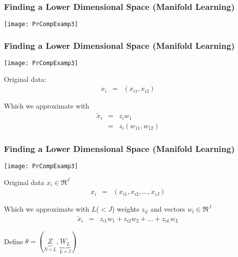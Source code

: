 \begin{frame}[fragile]
\frametitle{Finding a Lower Dimensional Space (Manifold Learning)}
\begin{center}
\texttt{[image: PrCompExamp3]}
\end{center}
\end{frame}


\begin{frame}[fragile]
\frametitle{Finding a Lower Dimensional Space (Manifold Learning)}
\begin{center}
\texttt{[image: PrCompExamp3]}
\end{center}
Original data:
\begin{eqnarray}
{x}_{i} & = &  (x_{i1}, x_{i2}) \nonumber 
\end{eqnarray}

Which we approximate with  
\begin{eqnarray}
\tilde{{x}}_{i} & = & z_{i} {w}_{1} \nonumber \\
& =& z_{i} (w_{11}, w_{12}) \nonumber 
\end{eqnarray}
\end{frame}


\begin{frame}[fragile]
\frametitle{Finding a Lower Dimensional Space (Manifold Learning)}


\begin{center}
\texttt{[image: PrCompExamp3]}
\end{center}

Original data ${x}_{i} \in \Re^{J}$ 
\begin{eqnarray}
{x}_{i} & = & (x_{i1}, x_{i2}, \hdots, x_{iJ}) \nonumber 
\end{eqnarray}

Which we approximate with $L$($<J$) weights $z_{il}$ and vectors ${w}_{l} \in \Re^{J}$
\begin{eqnarray}
\tilde{{x}}_{i} & = & z_{i1} {w}_{1} + z_{i2} {w}_{2} + \hdots + z_{iL} {w}_{L} \nonumber 
\end{eqnarray}

Define ${\theta} = (\underbrace{{Z}}_{N \times L}, \underbrace{{W}_{L}}_{L \times J} )$ 


\end{frame}




